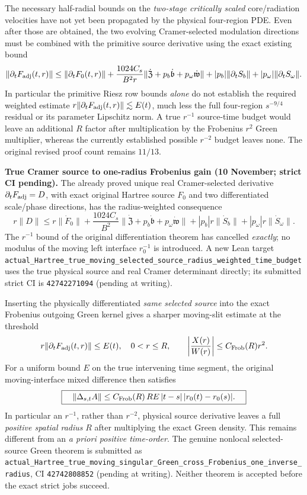 \documentclass[11pt]{amsart}
\begin{document}
The necessary half-radial bounds on the \emph{two-stage critically scaled}
core/radiation velocities have not yet been propagated by the physical
four-region PDE. Even after those are obtained, the two evolving
Cramer-selected modulation directions must be combined with the
primitive source derivative using the exact existing bound
\[
 \|\partial_tF_{\rm adj}(t,r)\|
 \le \|\partial_tF_0(t,r)\|+
 \frac{1024C_s}{B^2r}
       \|\dot{\mathfrak Z}+p_b\dot{\mathfrak b}
                              +p_\omega\dot{\mathfrak w}\|
 +|p_b|\|\partial_tS_b\|+|p_\omega|\|\partial_tS_\omega\|.
\]
In particular the primitive Riesz row bounds \emph{alone} do not
establish the required weighted estimate
$r\|\partial_tF_{\rm adj}(t,r)\|\lesssim E(t)$, much less the
full four-region $s^{-9/4}$ residual or its parameter Lipschitz norm.
A true $r^{-1}$ source-time budget would leave an additional
$R$ factor after multiplication by the Frobenius $r^2$ Green
multiplier, whereas the currently established possible $r^{-2}$
budget leaves none. The original revised proof count remains $11/13$.



\medskip
\noindent\textbf{True Cramer source to one-radius Frobenius gain (10 November; strict CI pending).}
The already proved unique real Cramer-selected derivative
\(\partial_tF_{\rm adj}=D\), with exact original Hartree source
\(F_0\) and two differentiated scale/phase directions, has the
radius-weighted consequence
\[
 \boxed{\quad
 r\|D\|\le r\|\dot F_0\|
   +\frac{1024C_s}{B^2}
     \|\dot{\mathfrak Z}+p_b\dot{\mathfrak b}
                          +p_\omega\dot{\mathfrak w}\|
   +|p_b|r\|\dot S_b\|+|p_\omega|r\|\dot S_\omega\|.
 \quad}
\]
The \(r^{-1}\) bound of the original differentiation theorem
has cancelled \emph{exactly}; no modulus of the moving left interface
\(r_0^{-1}\) is introduced. A new Lean target
\texttt{actual\_Hartree\_true\_moving\_selected\_source\_radius\_weighted\_time\_budget}
uses the true physical source and real Cramer determinant directly;
its submitted strict CI is
\texttt{42742271094} (pending at writing).

Inserting the physically differentiated \emph{same selected source}
into the exact Frobenius outgoing Green kernel gives a sharper
moving-slit estimate at the threshold
\[
 r\|\partial_tF_{\rm adj}(t,r)\|\le E(t),
 \quad 0<r\le R,\qquad
 \left|\frac{X(r)}{W(r)}\right|
 \le C_{\mathrm{Frob}}(R)r^2.
\]
For a uniform bound \(E\) on the true intervening time segment,
the original moving-interface mixed difference then satisfies
\[
 \boxed{\quad
 \|\Delta_{s,t}A\|
 \le C_{\rm Frob}(R)\,R E\,
      |t-s|\,|r_0(t)-r_0(s)|.
 \quad}
\]
In particular an \(r^{-1}\), rather than \(r^{-2}\),
physical source derivative leaves a full \emph{positive spatial
radius} \(R\) after multiplying the exact Green density.
This remains different from an \emph{a priori positive time-order}.
The genuine nonlocal selected-source Green theorem is submitted
as \texttt{actual\_Hartree\_true\_moving\_singular\_Green\_cross\_Frobenius\_one\_inverse\_radius},
CI \texttt{42742808852} (pending at writing).
Neither theorem is accepted before the exact strict jobs succeed.
\end{document}
